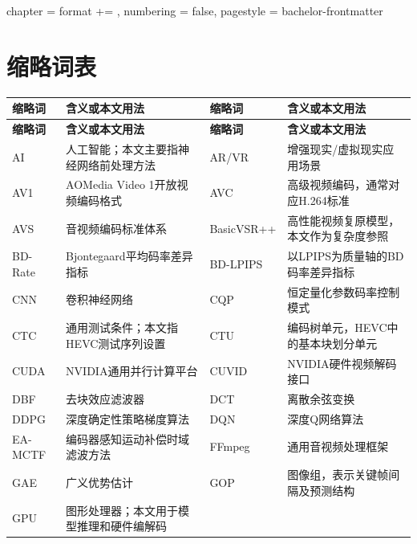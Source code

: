 
\newpage
\begingroup
  \ctexset
    {
      chapter =
        {
          format += \centering,
          numbering = false,
          pagestyle = bachelor-frontmatter
        }
    }
  \chapter{缩略词表}
\endgroup

\begingroup
{}
\setlength{\tabcolsep}{3pt}
\setlength{\LTpre}{0pt}
\setlength{\LTpost}{0pt}
\renewcommand{\arraystretch}{1.08}
\begin{longtable}
  {
    |>{\centering\arraybackslash}m{1.95cm}
    |>{\centering\arraybackslash}m{4.70cm}
    |>{\centering\arraybackslash}m{1.95cm}
    |>{\centering\arraybackslash}m{4.70cm}|
  }
  \hline
  \textbf{缩略词} & \textbf{含义或本文用法} &
  \textbf{缩略词} & \textbf{含义或本文用法} \\
  \hline
  \endfirsthead
  \hline
  \textbf{缩略词} & \textbf{含义或本文用法} &
  \textbf{缩略词} & \textbf{含义或本文用法} \\
  \hline
  \endhead
  \hline
  \endfoot
  \hline
  \endlastfoot
  AI & 人工智能；本文主要指神经网络前处理方法 &
  AR/VR & 增强现实/虚拟现实应用场景 \\
  \hline
  AV1 & AOMedia Video 1开放视频编码格式 &
  AVC & 高级视频编码，通常对应H.264标准 \\
  \hline
  AVS & 音视频编码标准体系 &
  BasicVSR++ & 高性能视频复原模型，本文作为复杂度参照 \\
  \hline
  BD-Rate & Bjontegaard平均码率差异指标 &
  BD-LPIPS & 以LPIPS为质量轴的BD码率差异指标 \\
  \hline
  CNN & 卷积神经网络 &
  CQP & 恒定量化参数码率控制模式 \\
  \hline
  CTC & 通用测试条件；本文指HEVC测试序列设置 &
  CTU & 编码树单元，HEVC中的基本块划分单元 \\
  \hline
  CUDA & NVIDIA通用并行计算平台 &
  CUVID & NVIDIA硬件视频解码接口 \\
  \hline
  DBF & 去块效应滤波器 &
  DCT & 离散余弦变换 \\
  \hline
  DDPG & 深度确定性策略梯度算法 &
  DQN & 深度Q网络算法 \\
  \hline
  EA-MCTF & 编码器感知运动补偿时域滤波方法 &
  FFmpeg & 通用音视频处理框架 \\
  \hline
  GAE & 广义优势估计 &
  GOP & 图像组，表示关键帧间隔及预测结构 \\
  \hline
  GPU & 图形处理器；本文用于模型推理和硬件编解码 &

\end{longtable}
